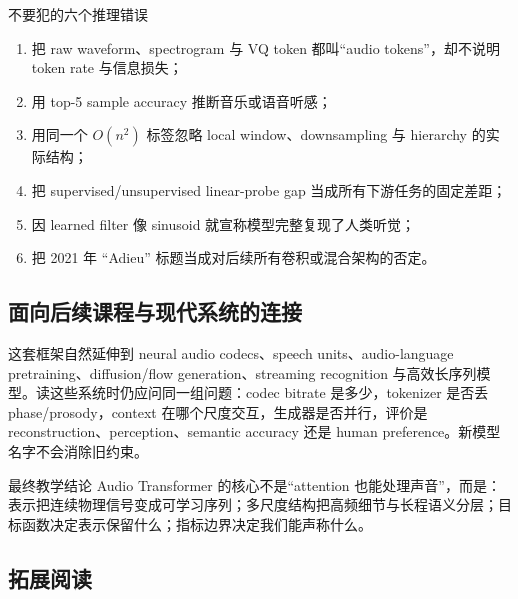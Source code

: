 \documentclass[a4paper]{article}
\begin{document}
\begin{warningbox}{不要犯的六个推理错误}
\begin{enumerate}
  \item 把 raw waveform、spectrogram 与 VQ token 都叫“audio tokens”，却不说明 token rate 与信息损失；
  \item 用 top-5 sample accuracy 推断音乐或语音听感；
  \item 用同一个 $O(n^2)$ 标签忽略 local window、downsampling 与 hierarchy 的实际结构；
  \item 把 supervised/unsupervised linear-probe gap 当成所有下游任务的固定差距；
  \item 因 learned filter 像 sinusoid 就宣称模型完整复现了人类听觉；
  \item 把 2021 年 “Adieu” 标题当成对后续所有卷积或混合架构的否定。
\end{enumerate}
\end{warningbox}

\subsection{面向后续课程与现代系统的连接}

这套框架自然延伸到 neural audio codecs、speech units、audio-language pretraining、diffusion/flow generation、streaming recognition 与高效长序列模型。读这些系统时仍应问同一组问题：codec bitrate 是多少，tokenizer 是否丢 phase/prosody，context 在哪个尺度交互，生成器是否并行，评价是 reconstruction、perception、semantic accuracy 还是 human preference。新模型名字不会消除旧约束。

\begin{importantbox}{最终教学结论}
Audio Transformer 的核心不是“attention 也能处理声音”，而是：表示把连续物理信号变成可学习序列；多尺度结构把高频细节与长程语义分层；目标函数决定表示保留什么；指标边界决定我们能声称什么。
\end{importantbox}

\subsection{拓展阅读}
\end{document}
